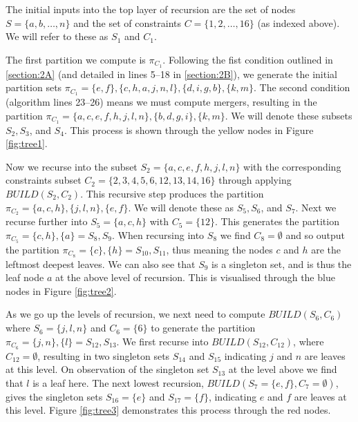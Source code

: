 \documentclass[a4paper, 11pt]{article}
\begin{document}
	The initial inputs into the top layer of recursion are the set of nodes $S = \{a, b, \ldots, n\}$ and the set of constraints $C = \{1, 2, \ldots, 16\}$ (as indexed above). We will refer to these as $S_{1}$ and $C_{1}$.
	
	The first partition we compute is $\pi_{C_{1}}$. Following the fist condition outlined in \ref{section:2A} (and detailed in lines 5--18 in \ref{section:2B}), we generate the initial partition sets $\pi_{C_{1}} = \{e, f\}, \{c, h, a, j, n, l\}, \{d, i, g, b\}, \{k, m\}$. The second condition (algorithm lines 23--26) means we must compute mergers, resulting in the partition $\pi_{C_{1}} = \{a, c, e, f, h, j, l, n\}, \{b, d, g, i\}, \{k, m\}$. We will denote these subsets $S_{2}, S_{3}$, and $S_{4}$. This process is shown through the yellow nodes in Figure \ref{fig:tree1}.
	
	Now we recurse into the subset $S_{2} = \{a, c, e, f, h, j, l, n\}$ with the corresponding constraints subset $C_{2} = \{2, 3, 4, 5, 6, 12, 13, 14, 16\}$ through applying $BUILD(S_{2}, C_{2})$. This recursive step produces the partition $\pi_{C_{2}} = \{a, c, h\}, \{j, l, n\}, \{e, f\}$. We will denote these as $S_{5}, S_{6}$, and $S_{7}$. Next we recurse further into $S_{5} = \{a, c, h\}$ with $C_{5} = \{12\}$. This generates the partition $\pi_{C_{5}} = \{c, h\}, \{a\} = S_{8}, S_{9}$. When recursing into $S_{8}$ we find $C_{8} = \emptyset$ and so output the partition $\pi_{C_{8}} = \{c\}, \{h\} = S_{10}, S_{11}$, thus meaning the nodes $c$ and $h$ are the leftmost deepest leaves. We can also see that $S_{9}$ is a singleton set, and is thus the leaf node $a$ at the above level of recursion. This is visualised through the blue nodes in Figure \ref{fig:tree2}.
	
	As we go up the levels of recursion, we next need to compute $BUILD(S_{6}, C_{6})$ where $S_{6} = \{j, l, n\}$ and $C_{6} = \{6\}$ to generate the partition $\pi_{C_{6}} = \{j, n\}, \{l\} = S_{12}, S_{13}$. We first recurse into $BUILD(S_{12}, C_{12})$, where $C_{12} = \emptyset$, resulting in two singleton sets $S_{14}$ and $S_{15}$ indicating $j$ and $n$ are leaves at this level. On observation of the singleton set $S_{13}$ at the level above we find that $l$ is a leaf here. The next lowest recursion, $BUILD(S_{7} = \{e, f\}, C_{7} = \emptyset)$, gives the singleton sets $S_{16} = \{e\}$ and $S_{17} = \{f\}$, indicating $e$ and $f$ are leaves at this level. Figure \ref{fig:tree3} demonstrates this process through the red nodes.
	
\end{document}
